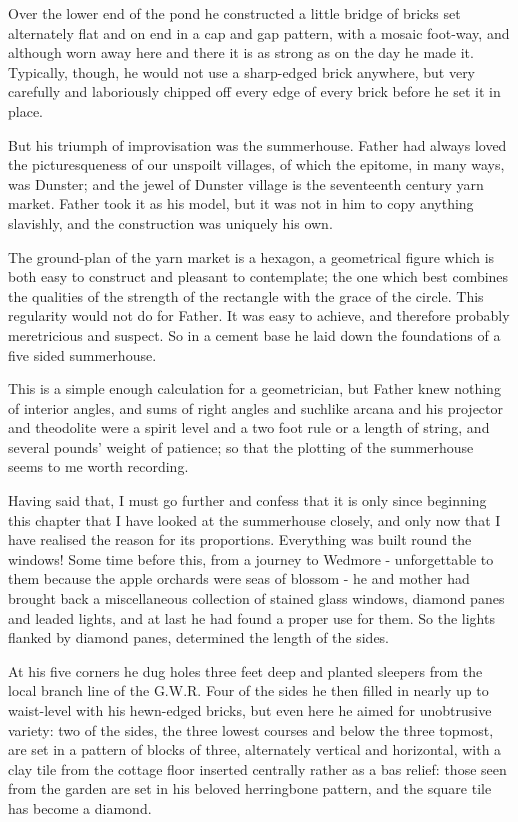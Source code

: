 Over the lower end of the pond he constructed a little bridge of bricks set alternately flat and on end in a cap and gap pattern, with a mosaic foot-way, and although worn away here and there it is as strong as on the day he made it. Typically, though, he would not use a sharp-edged brick anywhere, but very carefully and laboriously chipped off every edge of every brick before he set it in place.

But his triumph of improvisation was the summerhouse. Father had always loved the picturesqueness of our unspoilt villages, of which the epitome, in many ways, was Dunster; and the jewel of Dunster village is the seventeenth century yarn market. Father took it as his model, but it was not in him to copy anything slavishly, and the construction was uniquely his own.

The ground-plan of the yarn market is a hexagon, a geometrical figure which is both easy to construct and pleasant to contemplate; the one which best combines the qualities of the strength of the rectangle with the grace of the circle. This regularity would not do for Father. It was easy to achieve, and therefore probably meretricious and suspect. So in a cement base he laid down the foundations of a five sided summerhouse.

This is a simple enough calculation for a geometrician, but Father knew nothing of interior angles, and sums of right angles and suchlike arcana and his projector and theodolite were a spirit level and a two foot rule or a length of string, and several pounds' weight of patience; so that the plotting of the summerhouse seems to me worth recording.

Having said that, I must go further and confess that it is only since beginning this chapter that I have looked at the summerhouse closely, and only now that I have realised the reason for its proportions. Everything was built round the windows! Some time before this, from a journey to Wedmore - unforgettable to them because the apple orchards were seas of blossom - he and mother had brought back a miscellaneous collection of stained glass windows, diamond panes and leaded lights, and at last he had found a proper use for them. So the lights flanked by diamond panes, determined the length of the sides.

At his five corners he dug holes three feet deep and planted sleepers from the local branch line of the G.W.R. Four of the sides he then filled in nearly up to waist-level with his hewn-edged bricks, but even here he aimed for unobtrusive variety: two of the sides, the three lowest courses and below the three topmost, are set in a pattern of blocks of three, alternately vertical and horizontal, with a clay tile from the cottage floor inserted centrally rather as a bas relief: those seen from the garden are set in his beloved herringbone pattern, and the square tile has become a diamond.


